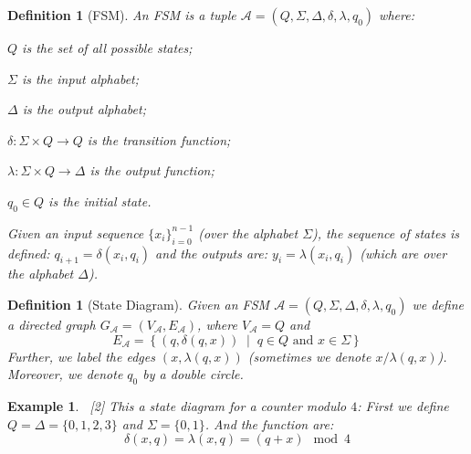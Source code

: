 \documentclass[12pt]{article}
\newcommand{\set}[2]{\left\{{#1}\;\middle|\;{#2}\right\}}
\newcommand*{\B}{\{0,1\}}
\newtheorem{definition}[theorem]{Definition}
\newtheorem{example}[theorem]{Example}
\begin{document}
\begin{definition}[FSM]
  An FSM is a tuple $\mathcal{A}=(Q,\Sigma,\Delta,\delta,\lambda,q_0)$ where:
  \begin{compactenum}[(i)]
    \item $Q$ is the set of all possible states;
    \item $\Sigma$ is the input alphabet;
    \item $\Delta$ is the output alphabet;
    \item $\delta:\Sigma\times Q\to Q$ is the transition function;
    \item $\lambda:\Sigma\times Q\to \Delta$ is the output function;
    \item $q_0\in Q$ is the initial state.
  \end{compactenum}
  Given an input sequence $\{x_i\}_{i=0}^{n-1}$ (over the alphabet $\Sigma$), the sequence of states is defined: $q_{i+1}=\delta(x_i,q_i)$ and the outputs are: $y_i=\lambda(x_i,q_i)$ (which are over the alphabet $\Delta$).
\end{definition}

\begin{definition}[State Diagram]
  Given an FSM $\mathcal{A}=(Q,\Sigma,\Delta,\delta,\lambda,q_0)$ we define a directed graph $G_{\mathcal{A}}=(V_{\mathcal{A}},E_{\mathcal{A}})$, where $V_{\mathcal{A}}=Q$ and $$E_{\mathcal{A}}=\set{(q,\delta(q,x))}{q\in Q\text{ and }x\in\Sigma}$$ Further, we label the edges $(x,\lambda(q,x))$ (sometimes we denote $x/\lambda(q,x)$). Moreover, we denote $q_0$ by a double circle.
\end{definition}

\begin{example}
  $\,$
  [2]
  \noindent This a state diagram for a counter modulo $4$: First we define $Q=\Delta=\{0,1,2,3\}$ and $\Sigma=\B$. And the function are: $$\delta(x,q)=\lambda(x,q)=(q+x)\mod 4$$
\end{example}
\end{document}
